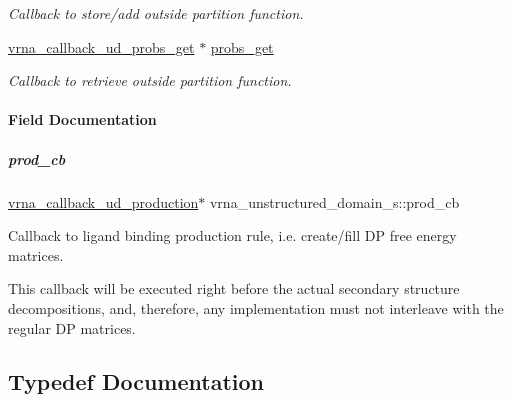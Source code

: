 \begin{DoxyCompactItemize}
\begin{DoxyCompactList}\small\item\em Callback to store/add outside partition function. \end{DoxyCompactList}\item 
\mbox{\label{group__domains__up_a0b155283bccf65c5253f31e0211ae8ff}} 
\hyperlink{group__domains__up_gaa10ba1b6f1e179ea84c5caca9cdaae67}{vrna\+\_\+callback\+\_\+ud\+\_\+probs\+\_\+get} $\ast$ \hyperlink{group__domains__up_a0b155283bccf65c5253f31e0211ae8ff}{probs\+\_\+get}
\begin{DoxyCompactList}\small\item\em Callback to retrieve outside partition function. \end{DoxyCompactList}\end{DoxyCompactItemize}


\paragraph{Field Documentation}
\mbox{\label{group__domains__up_ac2656d57130ac56e85212836482cbe80}} 
\subparagraph{\texorpdfstring{prod\+\_\+cb}{prod\_cb}}
{\footnotesize\ttfamily \hyperlink{group__domains__up_ga4fdfc02c1b660c07f2d887772f02a0a1}{vrna\+\_\+callback\+\_\+ud\+\_\+production}$\ast$ vrna\+\_\+unstructured\+\_\+domain\+\_\+s\+::prod\+\_\+cb}



Callback to ligand binding production rule, i.\+e. create/fill DP free energy matrices. 

This callback will be executed right before the actual secondary structure decompositions, and, therefore, any implementation must not interleave with the regular DP matrices. 

\subsection{Typedef Documentation}
\mbox{\label{group__domains__up_ga75825c57d0bfde4ae4f95c044260c5c3}} 
